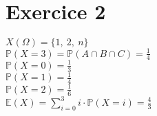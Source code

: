 \documentclass[td3.tex]{subfiles}
\begin{document}
\section{Exercice 2}
$X(\Omega) = \{ 1,~2,~n \}$ \\
$\mathbb{P}(X = 3) = \mathbb{P}(A \cap B \cap C) = \frac{1}{4}$ \\
$\mathbb{P}(X = 0) = \frac{1}{3}$ \\
$\mathbb{P}(X = 1) = \frac{1}{4}$ \\
$\mathbb{P}(X = 2) = \frac{1}{6}$ \\
$\mathbb{E}(X) = \sum_{i=0}^{3} i\cdot \mathbb{P}(X=i) = \frac{4}{3}$
\end{document}
